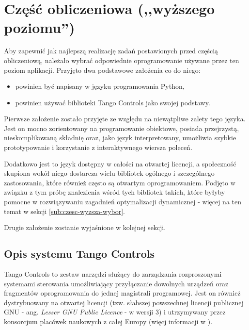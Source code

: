 \section{Część obliczeniowa (,,wyższego poziomu'')}
\label{sec:czesc-wyzsza}

Aby zapewnić jak najlepszą realizację zadań postawionych przed częścią obliczeniową, należało wybrać odpowiednie oprogramowanie używane przez ten poziom aplikacji. Przyjęto dwa podstawowe założenia co do niego:
\begin{itemize}
    \item powinien być napisany w języku programowania Python,
    \item powinien używać biblioteki Tango Controls jako swojej podstawy.
\end{itemize}

Pierwsze założenie zostało przyjęte ze względu na niewątpliwe zalety tego języka. Jest on mocno zorientowany na programowanie obiektowe, posiada przejrzystą, nieskomplikowaną składnię oraz, jako język interpretowany, umożliwia szybkie prototypowanie i korzystanie z interaktywnego wiersza poleceń.

Dodatkowo jest to język dostępny w całości na otwartej licencji, a społeczność skupiona wokół niego dostarcza wielu bibliotek ogólnego i szczególnego zastosowania, które również często są otwartym oprogramowaniem. Podjęto w związku z tym próbę znalezienia wśród tych bibliotek takich, które byłyby pomocne w rozwiązywaniu zagadnień optymalizacji dynamicznej - więcej na ten temat w sekcji \ref{sub:czesc-wyzsza-wybor}.

Drugie założenie zostanie wyjaśnione w kolejnej sekcji.

\subsection{Opis systemu Tango Controls}
\label{sub:czesc-wyzsza-tango}

Tango Controls to zestaw narzędzi służący do zarządzania rozproszonymi systemami sterowania umożliwiający przyłączanie dowolnych urządzeń oraz fragmentów oprogramowania do jednej magistrali programowej. Jest on również dystrybuowany na otwartej licencji (tzw. słabszej powszechnej licencji publicznej GNU - ang. \emph{Lesser GNU Public Licence} - w wersji 3) i utrzymywany przez konsorcjum placówek naukowych z całej Europy (więcj informacji w \cite{TangoWebsite}).


